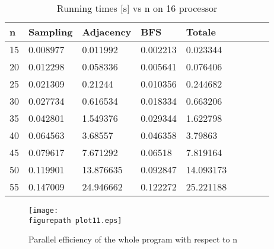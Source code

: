 \begin{table}[h!] 
\centering
\caption{Running times [s] vs n on 16 processor \label{fig:runtimes16}}
\begin{tabular}{|l|l|l|l|l|l|l|l|l|}
\hline
n&	Sampling&	Adjacency&	BFS&			Totale  \\ \hline
15&	0.008977	&	0.011992	&	0.002213	&	0.023344\\
20&	0.012298	&	0.058336	&	0.005641	&	0.076406\\
25&	0.021309	&	0.21244	&	0.010356	&	0.244682\\
30&	0.027734	&	0.616534	&	0.018334	&	0.663206\\
35&	0.042801	&	1.549376	&	0.029344	&	1.622798\\
40&	0.064563	&	3.68557	&	0.046358	&	3.79863\\
45&	0.079617	&	7.671292	&	0.06518	&	7.819164\\
50&	0.119901	&	13.876635&	0.092847	&	14.093173\\
55&	0.147009	&	24.946662&	0.122272	&	25.221188\\
\hline
\end{tabular}
\end{table}



\begin{figure}[h!] 
 \center 
 \texttt{[image: \\figurepath plot11.eps]}
 \caption{ Parallel efficiency of the whole program with respect to n \label{fig:parallel_efficiency_n}}
 \end{figure}
